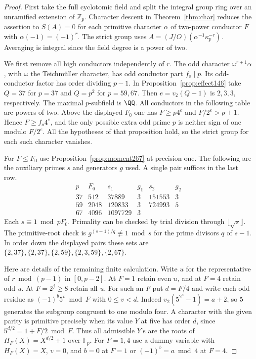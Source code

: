 \documentclass[a4paper,11pt]{article}
\theoremstyle{definition}
\theoremstyle{remark}
\newcommand{\ZZ}{\mathbb Z}\newcommand{\ord}{\operatorname{ord}}
\numberwithin{equation}{section}
\begin{document}
\begin{proof}
First take the full cyclotomic field and split the integral
group ring over an unramified extension of \(\ZZ_p\).
Character descent in Theorem~\ref{thm:char} reduces the assertion
to \(S(A)=0\) for each primitive character \(\alpha\) of
two-power conductor \(F\) with \(\alpha(-1)=(-1)^r\).
The strict group uses \(A=(J/O)(\alpha^{-1}\kappa_p^{-r})\).
Averaging is integral since the field degree is a power of two.

We first remove all high conductors independently of \(r\).
The odd character \(\omega^{r+1}\alpha\), with \(\omega\) the
Teichm\"uller character, has odd conductor part \(f_o\mid p\).
Its odd-conductor factor has order dividing \(p-1\). In
Proposition~\ref{prop:effect146} take \(Q=37\) for \(p=37\)
and \(Q=p^2\) for \(p=59,67\). Then \(e=v_2(Q-1)\) is
\(2,3,3\), respectively. The maximal \(p\)-subfield is \(\QQ\).
All conductors in the following table are powers of two. Above
the displayed \(F_0\) one has \(F\ge p4^e\) and
\(F/2^e>p+1\). Hence \(F\ge f_o4^e\), and the only possible
extra odd prime \(p\) is neither sign of one modulo \(F/2^e\).
All the hypotheses of that proposition hold, so the strict
group for each such character vanishes.

For \(F\le F_0\) use Proposition~\ref{prop:moment267} at
precision one. The following are the auxiliary primes \(s\)
and generators \(g\) used. A single pair suffices in the last
row.
\[
\begin{array}{c|r|rr|rr}
p&F_0&s_1&g_1&s_2&g_2\\ \hline
37&512&37889&3&151553&3\\
59&2048&120833&3&724993&5\\
67&4096&1097729&3& & 
\end{array}
\]
Each \(s\equiv1\bmod p F_0\). Primality can be checked by trial
division through \(\lfloor\sqrt{s}\rfloor\). The primitive-root
check is \(g^{(s-1)/q}\not\equiv1\bmod s\) for the prime
divisors \(q\) of \(s-1\). In order down the displayed pairs
these sets are \(\{2,37\},\{2,37\},\{2,59\},\{2,3,59\},\{2,67\}\).

Here are details of the remaining finite calculation. Write
\(u\) for the representative of \(r\bmod(p-1)\) in
\([0,p-2]\). At \(F=1\) retain even \(u\), and at \(F=4\)
retain odd \(u\). At \(F=2^j\ge8\) retain all \(u\).
For such an \(F\) put \(d=F/4\) and write each odd residue
as \((-1)^b5^v\bmod F\) with \(0\le v<d\).
Indeed \(v_2(5^{2^a}-1)=a+2\), so \(5\) generates the
subgroup congruent to one modulo four. A character with the
given parity is primitive precisely when its value \(Y\) at
five has order \(d\), since \(5^{d/2}=1+F/2\bmod F\).
Thus all admissible \(Y\)'s are the roots of
\(H_F(X)=X^{d/2}+1\) over \(\overline{\mathbb F}_p\).
For \(F=1,4\) use a dummy variable with \(H_F(X)=X\),
\(v=0\), and \(b=0\) at \(F=1\) or \((-1)^b=a\bmod4\)
at \(F=4\).


\end{proof}
\end{document}
